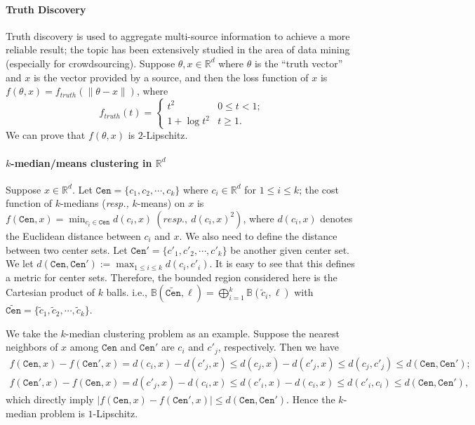 \paragraph{Truth Discovery~\cite{LiXY20,DBLP:journals/sigkdd/LiGMLSZFH15}} Truth discovery is used to aggregate multi-source information to achieve a more reliable result; the topic has been extensively studied in the area of data mining (especially for crowdsourcing). Suppose
$ \theta,x\in\mathbb{R}^d $ where $\theta$ is the ``truth vector'' and $x$ is the vector provided by a source, and then the loss function of $x$ is $ f(\theta,x)=f_{truth}(\|\theta-x\|) $, where
\begin{equation}
	f_{truth}(t)=
	\begin{cases}
		t^2\quad &0 \leq t < 1;  \\
		1+\log t^2 & t \geq 1.
	\end{cases}
\end{equation}
We can prove that $ f(\theta,x) $ is $ 2 $-Lipschitz.

\paragraph{$ k $-median/means clustering in $\mathbb{R}^d$} Suppose $x\in\mathbb{R}^d$. 
Let $ \mathtt{Cen}=\{c_1,c_2,\cdots,c_k \} $ where $ c_i\in \mathbb{R}^d $  for $1\leq i\leq k$; the cost function of $ k $-medians ({\em resp.,} $k$-means) on $x$ is $ f(\mathtt{Cen},x)=\min_{c_i\in \mathtt{Cen}}d(c_i,x)\ (resp.,\ d(c_i,x)^2) $, where $d(c_i,x)$ denotes the Euclidean distance between $c_i$ and $x$. We also need to define the distance between two center sets. Let   $ \mathtt{Cen}'=\{c'_1,c'_2,\cdots,c'_k \} $ be another given center set. 
We let $ d(\mathtt{Cen},\mathtt{Cen}') := \max_{1\leq i \leq k} d(c_i,c'_i) $. It is easy to see that this defines a metric for center sets. Therefore, the bounded region  considered here is the Cartesian product
 of $k$ balls. i.e., $ \mathbb{B}(\widetilde{\mathtt{Cen}},\ell) =\bigoplus_{i=1}^k \mathbb{B}(\tilde{c}_i,\ell) $ with $ \widetilde{\mathtt{Cen}}=\{\tilde{c}_1,\tilde{c}_2,\cdots,\tilde{c}_k \} $.


We take the $k$-median clustering problem as an example. Suppose the nearest neighbors of $x$ among $\mathtt{Cen}$ and $\mathtt{Cen}'$ are $c_i$ and $c'_j$, respectively.  Then we have
\begin{align*}
    f(\mathtt{Cen},x)-f(\mathtt{Cen}',x)=d(c_i,x)- d(c'_j,x)\leq d(c_j,x)-d(c'_j,x)\leq d(c_j,c'_j) \leq d(\mathtt{Cen},\mathtt{Cen}');\\
    f(\mathtt{Cen}',x)-f(\mathtt{Cen},x)=d(c'_j,x)- d(c_i,x)\leq d(c'_i,x)-d(c_i,x)\leq d(c'_i,c_i)\leq d(\mathtt{Cen},\mathtt{Cen}'),
\end{align*}
which directly imply $ |f(\mathtt{Cen},x)-f(\mathtt{Cen}',x)|\leq d(\mathtt{Cen},\mathtt{Cen}') $.
Hence the $k$-median problem is $ 1 $-Lipschitz.


